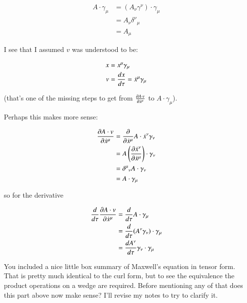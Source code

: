 \documentclass{article}      %
\begin{document}
\begin{align*}
A \cdot \gamma_\mu 
&= \left( A_\nu \gamma^\nu \right) \cdot \gamma_\mu \\
&= A_\nu {\delta^\nu}_\mu \\
&= A_\mu
\end{align*}

I see that I assumed $v$ was understood to be:

\begin{align*}
x &= x^\mu \gamma_\mu \\
v &= \frac{dx}{d\tau} = \xdot^\mu \gamma_\mu
\end{align*}

(that's one of the missing steps to get from $\PD{\xdot^\mu}{A \cdot v}$ to $A \cdot \gamma_\mu$).

Perhaps this makes more sense:

\begin{align*}
\PD{\xdot^\mu}{A \cdot v} 
&= \PD{\xdot^\mu}{} A \cdot \xdot^\nu \gamma_\nu \\
&= A \left( \PD{\xdot^\mu}{\xdot^\nu} \right) \cdot \gamma_\nu \\
&= {\delta^\mu}_\nu A \cdot \gamma_\nu \\
&= A \cdot \gamma_\mu \\
\end{align*}

so for the derivative

\begin{align*}
\frac{d}{d\tau} \PD{\xdot^\mu}{A \cdot v} 
&= \frac{d}{d\tau} A \cdot \gamma_\mu \\
&= \frac{d}{d\tau} (A^\nu \gamma_\nu) \cdot \gamma_\mu \\
&= \frac{dA^\nu}{d\tau} \gamma_\nu \cdot \gamma_\mu \\
\end{align*}

You included a nice little box summary of Maxwell's equation in tensor form.  That is pretty much identical to the curl
form, but to see the equivalence the product operations on a wedge are required.  Before mentioning any of that does this
part above now make sense?  I'll revise my notes to try to clarify it.

\end{document}

